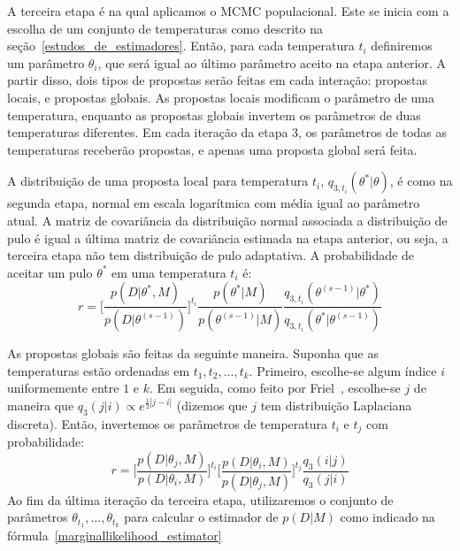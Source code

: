 \documentclass[12pt]{article}
\begin{document}
A terceira etapa é na qual aplicamos o MCMC populacional. Este se inicia 
com a escolha de um conjunto de temperaturas como descrito na 
seção~\ref{estudos_de_estimadores}. Então, para cada temperatura $t_i$ 
definiremos um parâmetro $\theta_i$, que será igual ao último parâmetro
aceito na etapa anterior. A partir disso, dois tipos de propostas serão 
feitas em cada interação: propostas locais, e propostas globais. As 
propostas locais modificam o parâmetro de uma temperatura, enquanto as 
propostas globais invertem os parâmetros de duas temperaturas 
diferentes. Em cada iteração da etapa 3, os parâmetros de todas as 
temperaturas receberão propostas, e apenas uma proposta global será 
feita.

A distribuição de uma proposta local para temperatura $t_i$,
$q_{3, t_i} (\theta^* | \theta)$, é  como na segunda etapa, normal em 
escala logarítmica com média igual ao parâmetro atual. A matriz de 
covariância da distribuição normal associada a distribuição de pulo é 
igual a última matriz de covariância estimada na etapa anterior, ou 
seja, a terceira etapa não tem distribuição de pulo adaptativa. A 
probabilidade de aceitar um pulo $\theta^*$ em uma temperatura $t_i$ é:
\begin{equation}\label{accepting_ratio_third_step}
    r = \bigg[\frac{p (D | \theta^*, M)}{p (D | \theta^{(s - 1)})}\bigg]^{t_i}
        \frac{p (\theta^* | M)}{p(\theta^{(s - 1)} | M)}
        \frac{q_{3, t_i} (\theta^{(s - 1)} | \theta^*)}{q_{3, t_i} (\theta^* | \theta^{(s - 1)})}
\end{equation}

As propostas globais são feitas da seguinte maneira. Suponha que as
temperaturas estão ordenadas em $t_1, t_2, ..., t_k$. Primeiro, 
escolhe-se algum índice $i$ uniformemente entre $1$ e $k$. Em seguida,
como feito por Friel~\cite{Friel2008}, escolhe-se $j$ de maneira que 
$q_3 (j | i) \propto e^{\frac{1}{2}|j - i|}$ (dizemos que $j$ tem 
distribuição Laplaciana discreta). Então, invertemos os 
parâmetros de temperatura $t_i$ e $t_j$ com probabilidade:
\begin{equation}
    r = \bigg[\frac{p (D | \theta_j, M)}{p (D | \theta_i, M)}\bigg]^{t_i}
        \bigg[\frac{p (D | \theta_i, M)}{p (D | \theta_j, M)}\bigg]^{t_j}
        \frac{q_3 (i | j)}{q_3 (j | i)}
\end{equation}
Ao fim da última iteração da terceira etapa, utilizaremos o conjunto de 
parâmetros $\theta_{t_1}, ..., \theta_{t_k}$ para calcular o estimador
de $p (D | M)$ como indicado na 
fórmula~\ref{marginallikelihood_estimator}
\end{document}
